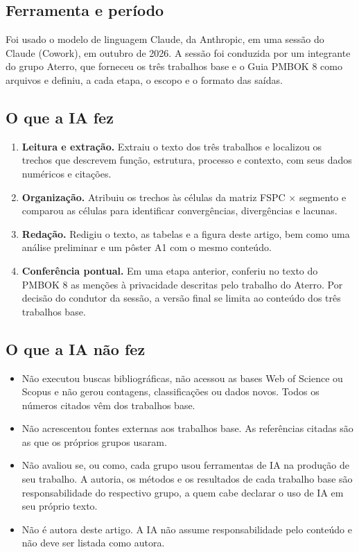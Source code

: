 \documentclass[12pt,a4paper,article,oneside,english,brazil]{abntex2}
\begin{document}
\subsection{Ferramenta e período}

Foi usado o modelo de linguagem Claude, da Anthropic, em uma sessão do Claude (Cowork), em outubro de 2026. A sessão foi conduzida por um integrante do grupo Aterro, que forneceu os três trabalhos base e o Guia PMBOK 8 como arquivos e definiu, a cada etapa, o escopo e o formato das saídas.

\subsection{O que a IA fez}

\begin{enumerate}
\item \textbf{Leitura e extração.} Extraiu o texto dos três trabalhos e localizou os trechos que descrevem função, estrutura, processo e contexto, com seus dados numéricos e citações.
\item \textbf{Organização.} Atribuiu os trechos às células da matriz FSPC $\times$ segmento e comparou as células para identificar convergências, divergências e lacunas.
\item \textbf{Redação.} Redigiu o texto, as tabelas e a figura deste artigo, bem como uma análise preliminar e um pôster A1 com o mesmo conteúdo.
\item \textbf{Conferência pontual.} Em uma etapa anterior, conferiu no texto do PMBOK 8 as menções à privacidade descritas pelo trabalho do Aterro. Por decisão do condutor da sessão, a versão final se limita ao conteúdo dos três trabalhos base.
\end{enumerate}

\subsection{O que a IA não fez}

\begin{itemize}
\item Não executou buscas bibliográficas, não acessou as bases Web of Science ou Scopus e não gerou contagens, classificações ou dados novos. Todos os números citados vêm dos trabalhos base.
\item Não acrescentou fontes externas aos trabalhos base. As referências citadas são as que os próprios grupos usaram.
\item Não avaliou se, ou como, cada grupo usou ferramentas de IA na produção de seu trabalho. A autoria, os métodos e os resultados de cada trabalho base são responsabilidade do respectivo grupo, a quem cabe declarar o uso de IA em seu próprio texto.
\item Não é autora deste artigo. A IA não assume responsabilidade pelo conteúdo e não deve ser listada como autora.
\end{itemize}
\end{document}
